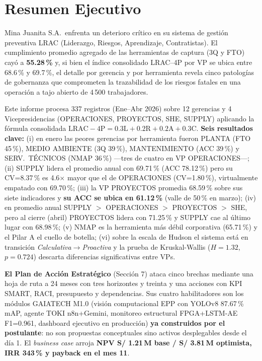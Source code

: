 \documentclass[12pt,a4paper]{article}
\begin{document}

\section{Resumen Ejecutivo}

Mina Juanita S.A.\ enfrenta un deterioro crítico en su sistema de gestión preventiva LRAC (Liderazgo, Riesgos, Aprendizaje, Contratistas). El cumplimiento promedio agregado de las herramientas de captura (3Q y FTO) cayó a \textbf{55.28\,\%} y, si bien el índice consolidado LRAC--4P por VP se ubica entre 68.6\,\% y 69.7\,\%, el detalle por gerencia y por herramienta revela cinco patologías de gobernanza que comprometen la trazabilidad de los riesgos fatales en una operación a tajo abierto de 4\,500 trabajadores.

Este informe procesa 337 registros (Ene--Abr 2026) sobre 12 gerencias y 4 Vicepresidencias (OPERACIONES, PROYECTOS, SHE, SUPPLY) aplicando la fórmula consolidada $\mathrm{LRAC{-}4P}=0.3\mathrm{L}+0.2\mathrm{R}+0.2\mathrm{A}+0.3\mathrm{C}$. \textbf{Seis resultados clave:} (i) en enero las peores gerencias por herramienta fueron PLANTA (FTO 45\,\%), MEDIO AMBIENTE (3Q 39\,\%), MANTENIMIENTO (ACC 39\,\%) y SERV.\ TÉCNICOS (NMAP 36\,\%) ---tres de cuatro en VP OPERACIONES---; (ii) SUPPLY lidera el promedio anual con 69.71\,\% (ACC 78.12\,\%) pero su CV=8.37\,\% es 4.6$\times$ mayor que el de OPERACIONES (CV=1.80\,\%), virtualmente empatado con 69.70\,\%; (iii) la VP PROYECTOS promedia 68.59\,\% sobre sus siete indicadores y \textbf{su ACC se ubica en 61.12\,\%} (valle de 50\,\% en marzo); (iv) en promedio anual SUPPLY $>$ OPERACIONES $>$ PROYECTOS $>$ SHE, pero al cierre (abril) PROYECTOS lidera con 71.25\,\% y SUPPLY cae al último lugar con 68.98\,\%; (v) NMAP es la herramienta más débil corporativa (65.71\,\%) y el Pilar A el cuello de botella; (vi) sobre la escala de Hudson el sistema está en transición \emph{Calculativa$\to$Proactiva} y la prueba de Kruskal-Wallis ($H=1.32$, $p=0.724$) descarta diferencias significativas entre VPs.

\textbf{El Plan de Acción Estratégico} (Sección 7) ataca cinco brechas mediante una hoja de ruta a 24 meses con tres horizontes y treinta y una acciones con KPI SMART, RACI, presupuesto y dependencias. Sus cuatro habilitadores son los módulos GAIATECH M1.0 (visión computacional EPP con YOLOv8 87.67\,\% mAP, agente TOKI n8n+Gemini, monitoreo estructural FPGA+LSTM-AE F1=0.961, dashboard ejecutivo en producción) \textbf{ya construidos por el postulante}: no son propuestas conceptuales sino activos desplegables desde el día 1. El \emph{business case} arroja \textbf{NPV S/ 1.21\,M base / S/ 3.81\,M optimista, IRR 343\,\% y payback en el mes 11}.
\end{document}
